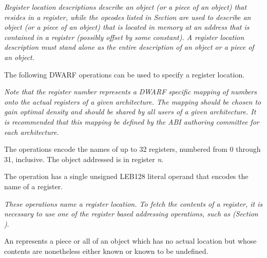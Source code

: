 \textit{Register location descriptions describe an object
(or a piece of an object) that resides in a register, while
the opcodes listed in 
Section 
are used to describe an object (or a piece of
an object) that is located in memory at an address that is
contained in a register (possibly offset by some constant). A
register location description must stand alone as the entire
description of an object or a piece of an object.
}

The following DWARF operations can be used to 
specify a register location.

\textit{Note that the register number represents a DWARF specific
mapping of numbers onto the actual registers of a given
architecture. The mapping should be chosen to gain optimal
density and should be shared by all users of a given
architecture. It is recommended that this mapping be defined
by the ABI authoring committee for each architecture.
}
\begin{enumerate}[1. ]
The \DWOPregnTARG{} operations encode the names of up to 32
registers, numbered from 0 through 31, inclusive. The object
addressed is in register \textit{n}.

\itembfnl{\DWOPregxTARG}
The \DWOPregxNAME{} operation has a single 
unsigned LEB128 literal
operand that encodes the name of a register.  

\end{enumerate}

\textit{These operations name a register location. To
fetch the contents of a register, it is necessary to use
one of the register based addressing operations, such as
\DWOPbregx{} 
(Section )}.

An 
represents a piece or all
of an object which has no actual location but whose contents
are nonetheless either known or known to be undefined.

